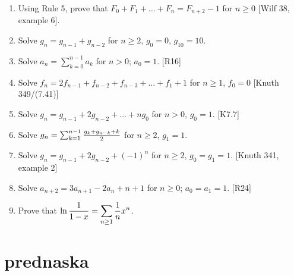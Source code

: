 \documentclass[10pt, a4paper]{article}
\newcommand*\ruleline[1]{\par\noindent\raisebox{.8ex}{\makebox[\linewidth]{\hrulefill\hspace{1ex}\raisebox{-.8ex}{#1}\hspace{1ex}\hrulefill}}}
\def\ans#1{\big[\hskip 2mm {#1}\hskip 2mm\big]}
\begin{document}
\ruleline{Exercises}

\begin{enumerate}
    \item Using Rule 5, prove that $F_0+F_1+\dots+F_n=F_{n+2}-1$ for $n\ge 0$ [Wilf 38, example 6].\\
    	\ans{Compare gfs of both sides, left is $f/(1-x)$, where $f = x/(1-x-x^2)$, i.e. Fibonacci.}
	\item Solve $g_n=g_{n-1}+g_{n-2}$ for $n\ge 2$, $g_0 = 0$, $g_{10} = 10$.\\
		\ans{$g_n = {g_{10}\over F_{10}}F_n$, try the ``boundary method'' described above, computer necessary}
    \item Solve $a_n = \sum_{k=0}^{n-1}a_k$ for $n > 0$; $a_0 = 1$. [R16]\\
    	\ans{$a_n = 2^{n-1}$ for $n \ge 1$}
    \item Solve $f_n=2f_{n-1}+f_{n-2}+f_{n-3}+\dots+f_1+1$ for $n\ge 1$, $f_0 = 0$ [Knuth 349/(7.41)]\\
    	\ans{$F(x) = x/(1-3x+x^2)$; $f_n=F_{2n}$}
    \item Solve $g_n = g_{n-1} + 2g_{n-2}+\dots +ng_0$ for $n> 0$, $g_0 = 1$. [K7.7]\\
    	\ans{$G(x)=1+x/(1-3x+x^2)$; $g_n=F_{2n} + [n=0]$}
    \item Solve $g_n = \sum_{k=1}^{n-1} {g_k + g_{n-k} + k\over 2}$ for $n\ge 2$, $g_1 = 1$.
    \item Solve $g_n=g_{n-1}+2g_{n-2}+(-1)^n$ for $n\ge 2$, $g_0 = g_1 = 1$. [Knuth 341, example 2]\\
    	\ans{$G(x) = {1+x+x^2\over (1-2x)(1+x)^2}$; $g_n = {7\over 9}2^n + {1\over 9}(3n+2)(-1)^n$}
    \item Solve $a_{n+2}=3a_{n+1}-2a_n+n+1$ for $n\ge 0$; $a_0 = a_1 = 1$. [R24]\\
    	\ans{$A(z) = {2\over 1-2z}-{1\over (1-z)^3}$; $a_n = 2^{n+1}-{n+2\choose 2}$}
    \item Prove that $\displaystyle \ln {1\over 1-x} = \sum_{n\ge 1} {1\over n} x^n$. \ans{consider $\int {1\over 1-x}$}
\end{enumerate}



\section{prednaska}
\end{document}

